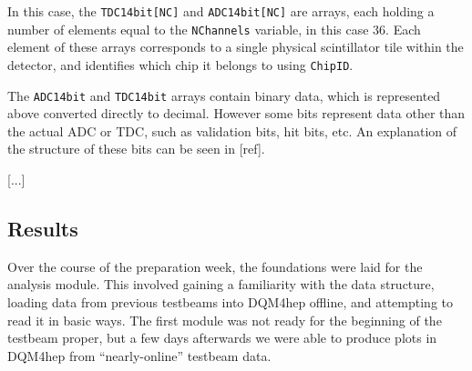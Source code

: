 %
%

In this case, the \texttt{TDC14bit[NC]} and \texttt{ADC14bit[NC]} are arrays, each holding a number of elements equal to the \texttt{NChannels} variable, in this case 36. Each element of these arrays corresponds to a single physical scintillator tile within the detector, and identifies which chip it belongs to using \texttt{ChipID}. 

The \texttt{ADC14bit} and \texttt{TDC14bit} arrays contain binary data, which is represented above converted directly to decimal. However some bits represent data other than the actual \acrshort{ADC} or \acrshort{TDC}, such as validation bits, hit bits, etc. An explanation of the structure of these bits can be seen in [ref].

[...] %

\subsection{Results}
Over the course of the preparation week, the foundations were laid for the analysis module. This involved gaining a familiarity with the data structure, loading data from previous testbeams into \acrshort{DQM4hep} offline, and attempting to read it in basic ways. The first module was not ready for the beginning of the testbeam proper, but a few days afterwards we were able to produce plots in \acrshort{DQM4hep} from ``nearly-online'' testbeam data.

